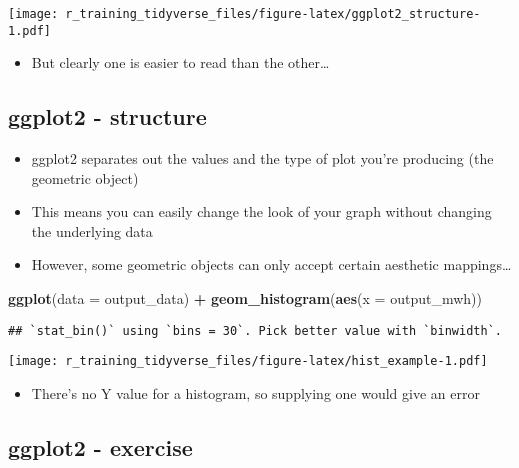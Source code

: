 \documentclass[]{article}
\newenvironment{Shaded}{\begin{snugshade}}{\end{snugshade}}
\newcommand{\KeywordTok}[1]{\textcolor[rgb]{0.13,0.29,0.53}{\textbf{#1}}}
\newcommand{\DataTypeTok}[1]{\textcolor[rgb]{0.13,0.29,0.53}{#1}}
\newcommand{\StringTok}[1]{\textcolor[rgb]{0.31,0.60,0.02}{#1}}
\newcommand{\OperatorTok}[1]{\textcolor[rgb]{0.81,0.36,0.00}{\textbf{#1}}}
\newcommand{\NormalTok}[1]{#1}
\providecommand{\tightlist}{%
  \setlength{\itemsep}{0pt}\setlength{\parskip}{0pt}}
\begin{document}
\texttt{[image: r\_training\_tidyverse\_files/figure-latex/ggplot2\_structure-1.pdf]}

\begin{itemize}
\tightlist
\item
  But clearly one is easier to read than the other\ldots{}
\end{itemize}

\subsection{ggplot2 - structure}\label{ggplot2---structure}

\begin{itemize}
\tightlist
\item
  ggplot2 separates out the values and the type of plot you're producing
  (the geometric object)
\item
  This means you can easily change the look of your graph without
  changing the underlying data
\item
  However, some geometric objects can only accept certain aesthetic
  mappings\ldots{}
\end{itemize}

\begin{Shaded}
\begin{Highlighting}[]
\KeywordTok{ggplot}\NormalTok{(}\DataTypeTok{data =}\NormalTok{ output_data) }\OperatorTok{+}\StringTok{ }\KeywordTok{geom_histogram}\NormalTok{(}\KeywordTok{aes}\NormalTok{(}\DataTypeTok{x =}\NormalTok{ output_mwh))}
\end{Highlighting}
\end{Shaded}

\begin{verbatim}
## `stat_bin()` using `bins = 30`. Pick better value with `binwidth`.
\end{verbatim}

\texttt{[image: r\_training\_tidyverse\_files/figure-latex/hist\_example-1.pdf]}

\begin{itemize}
\tightlist
\item
  There's no Y value for a histogram, so supplying one would give an
  error
\end{itemize}

\subsection{ggplot2 - exercise}\label{ggplot2---exercise}
\end{document}
